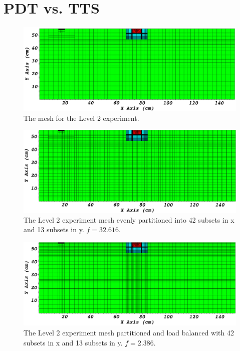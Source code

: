 \section{PDT vs. TTS}

\begin{figure}[H]
\centering
\includegraphics[scale=0.3]{../../figures/level2_nocut.png}
\caption{The mesh for the Level 2 experiment.}
\label{level2_nocut}
\end{figure}

\begin{figure}[H]
\centering
\includegraphics[scale=0.3]{../../figures/level2_42x13.png}
\caption{The Level 2 experiment mesh evenly partitioned into 42 subsets in x and 13 subsets in y. $f = 32.616$.}
\label{level2_42x13}
\end{figure}

\begin{figure}[H]
\centering
\includegraphics[scale=0.3]{../../figures/level2_42x13_balanced.png}
\caption{The Level 2 experiment mesh partitioned and load balanced with 42 subsets in x and 13 subsets in y. $f = 2.386$.}
\label{level2_42x13_balanced}
\end{figure}

